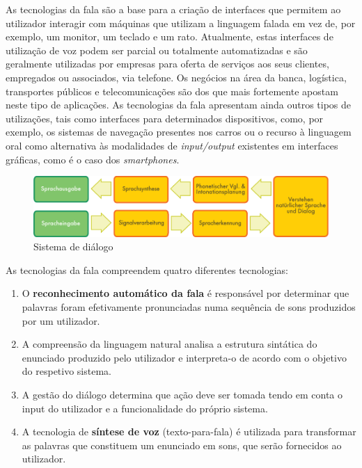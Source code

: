 \begin{multicols}{2}
 As tecnologias da fala são a base para a criação de interfaces que permitem ao utilizador interagir com máquinas que utilizam a linguagem falada em vez de, por exemplo, um monitor, um teclado e um rato. Atualmente, estas interfaces de utilização de voz podem ser parcial ou totalmente automatizadas e são geralmente utilizadas por empresas para oferta de serviços aos seus clientes, empregados ou associados, via telefone. Os negócios na área da banca, logística, transportes públicos e telecomunicações são dos que mais fortemente apostam neste tipo de aplicações. As tecnologias da fala apresentam ainda outros tipos de utilizações, tais como interfaces para determinados dispositivos, como, por exemplo, os sistemas de navegação presentes nos carros ou o recurso à linguagem oral como alternativa às mo\-da\-li\-da\-des de \textit{input/output} existentes em interfaces gráficas, como é o caso dos \textit{smartphones}.


\begin{figure}[htb]
  \center 
  \includegraphics[width=\textwidth]{../_media/german/simple_speech-based_dialogue_architecture}
  \caption{Sistema de diálogo}
  \label{fig:dialoguearch_de}
\end{figure}

As tecnologias da fala compreendem quatro diferentes tecnologias:

\begin{enumerate}
  \item O \textbf{reconhecimento automático da fala} é responsável por determinar que palavras foram efetivamente pronunciadas numa sequência de sons produzidos por um utilizador.
      \item A compreensão da linguagem natural analisa a estrutura sintática do enunciado produzido pelo utilizador e interpreta-o de acordo com o objetivo do respetivo sistema.
      \item A gestão do diálogo determina que ação deve ser tomada tendo em conta o input do utilizador e a funcionalidade do próprio sistema.
      \item A tecnologia de \textbf{síntese de voz} (texto-para-fala) é utilizada para transformar as palavras que constituem um enunciado em sons, que serão fornecidos ao utilizador.
\end{enumerate}


\end{multicols}
